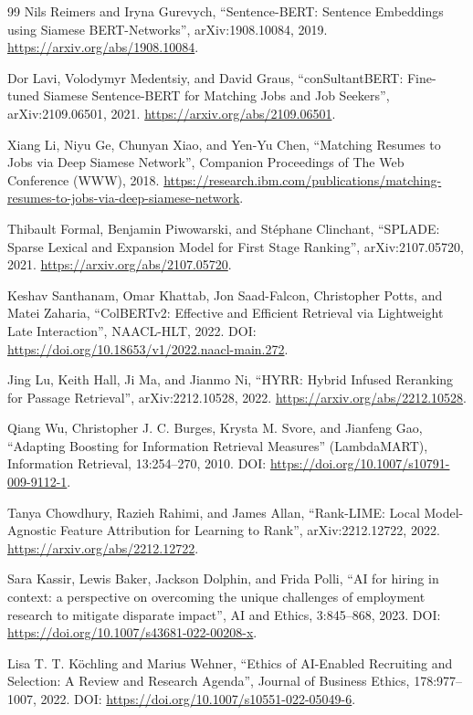 \begin{thebibliography}{99}
Nils Reimers and Iryna Gurevych, ``Sentence-BERT: Sentence Embeddings using Siamese BERT-Networks'', arXiv:1908.10084, 2019. \url{https://arxiv.org/abs/1908.10084}.

Dor Lavi, Volodymyr Medentsiy, and David Graus, ``conSultantBERT: Fine-tuned Siamese Sentence-BERT for Matching Jobs and Job Seekers'', arXiv:2109.06501, 2021. \url{https://arxiv.org/abs/2109.06501}.

Xiang Li, Niyu Ge, Chunyan Xiao, and Yen-Yu Chen, ``Matching Resumes to Jobs via Deep Siamese Network'', Companion Proceedings of The Web Conference (WWW), 2018. \url{https://research.ibm.com/publications/matching-resumes-to-jobs-via-deep-siamese-network}.

Thibault Formal, Benjamin Piwowarski, and Stéphane Clinchant, ``SPLADE: Sparse Lexical and Expansion Model for First Stage Ranking'', arXiv:2107.05720, 2021. \url{https://arxiv.org/abs/2107.05720}.

Keshav Santhanam, Omar Khattab, Jon Saad-Falcon, Christopher Potts, and Matei Zaharia, ``ColBERTv2: Effective and Efficient Retrieval via Lightweight Late Interaction'', NAACL-HLT, 2022. DOI: \url{https://doi.org/10.18653/v1/2022.naacl-main.272}.

Jing Lu, Keith Hall, Ji Ma, and Jianmo Ni, ``HYRR: Hybrid Infused Reranking for Passage Retrieval'', arXiv:2212.10528, 2022. \url{https://arxiv.org/abs/2212.10528}.

Qiang Wu, Christopher J. C. Burges, Krysta M. Svore, and Jianfeng Gao, ``Adapting Boosting for Information Retrieval Measures'' (LambdaMART), Information Retrieval, 13:254--270, 2010. DOI: \url{https://doi.org/10.1007/s10791-009-9112-1}.

Tanya Chowdhury, Razieh Rahimi, and James Allan, ``Rank-LIME: Local Model-Agnostic Feature Attribution for Learning to Rank'', arXiv:2212.12722, 2022. \url{https://arxiv.org/abs/2212.12722}.

Sara Kassir, Lewis Baker, Jackson Dolphin, and Frida Polli, ``AI for hiring in context: a perspective on overcoming the unique challenges of employment research to mitigate disparate impact'', AI and Ethics, 3:845--868, 2023. DOI: \url{https://doi.org/10.1007/s43681-022-00208-x}.

Lisa T. T. Köchling and Marius Wehner, ``Ethics of AI-Enabled Recruiting and Selection: A Review and Research Agenda'', Journal of Business Ethics, 178:977--1007, 2022. DOI: \url{https://doi.org/10.1007/s10551-022-05049-6}.

\end{thebibliography}
